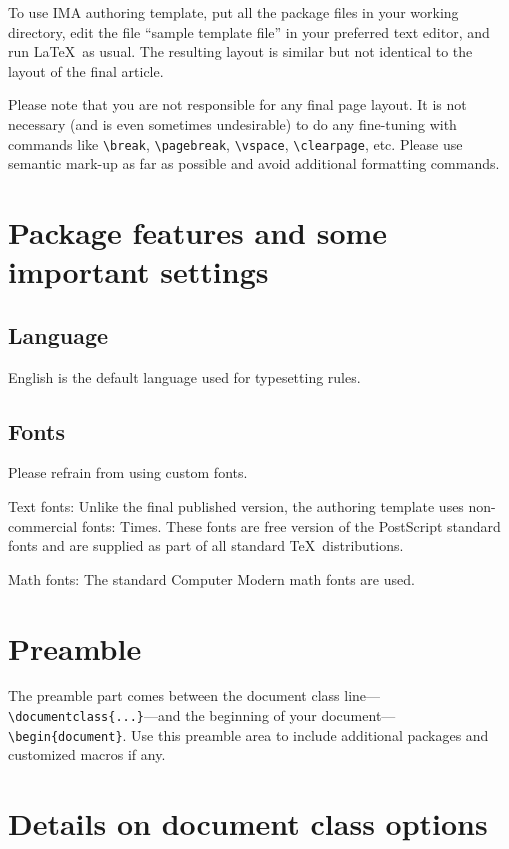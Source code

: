 \documentclass{article}
\begin{document}
To use IMA authoring template, put all the package files in your working directory, edit the file ``sample template file'' in your preferred text editor, and run \LaTeX\ as usual. The resulting layout is similar but not identical to the layout of the final article.

Please note that you are not responsible for any final page layout. It is not necessary (and is even sometimes undesirable) to do any fine-tuning with commands like \verb+\break+, \verb+\pagebreak+, \verb+\vspace+, \verb+\clearpage+, etc. Please use semantic mark-up as far as possible and avoid additional formatting commands.

\section{Package features and some important settings}

\subsection{Language}
English is the default language used for typesetting rules.

\subsection{Fonts}
Please refrain from using custom fonts.

\medskip

\noindent Text fonts: Unlike the final published version, the authoring template uses non-commercial fonts: Times. These fonts are free version of the PostScript standard fonts and are supplied as part of all standard \TeX\ distributions.

\medskip

\noindent Math fonts: The standard Computer Modern math fonts are used.

\section{Preamble}
The preamble part comes between the document class line---\newline\verb+\documentclass{...}+---and the beginning of your document---\verb+\begin{document}+. Use this preamble area to include additional packages and customized macros if any.

\section{Details on document class options}
\end{document}
